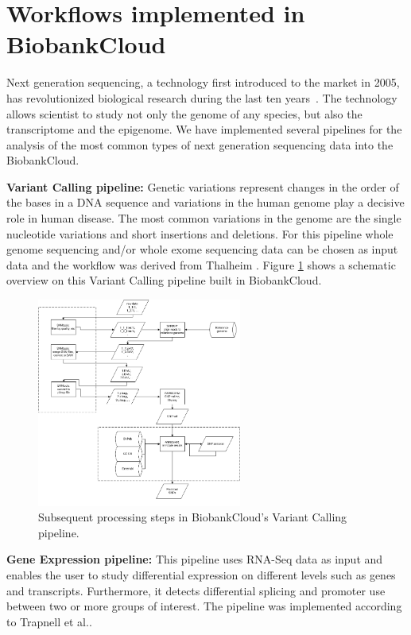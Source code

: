 \section{Workflows implemented in BiobankCloud}
Next generation sequencing, a technology first introduced to the market in 2005, has revolutionized biological research during the last ten years~\cite{shendure2008next}. The technology allows scientist to study not only the genome of any species, but also the transcriptome and the epigenome.
We have implemented several pipelines for the analysis of the most common types of next generation sequencing data into the BiobankCloud. 

\textbf{Variant Calling pipeline:} Genetic variations represent changes in the order of the bases in a DNA sequence and variations in the human genome play a decisive role in human disease. The most common variations in the genome are the single nucleotide variations and short insertions and deletions. For this pipeline whole genome sequencing and/or whole exome sequencing data can be chosen as input data and the workflow was derived from Thalheim \cite{snp_wf_thalheim}. Figure \ref{fig:workflow_snp} shows a schematic overview on this Variant Calling pipeline built in BiobankCloud.


\vskip-5pt
\begin{figure}[h]
\centering
\includegraphics[width=0.6\textwidth]{./imgs/wf_snp.png}
\caption{Subsequent processing steps in BiobankCloud's Variant Calling pipeline.}
\label{fig:workflow_snp}
\end{figure}
\vskip-5pt


\textbf{Gene Expression pipeline:} This pipeline uses RNA-Seq data as input and enables the user to study differential expression on different levels such as 
genes and transcripts. Furthermore, it detects differential splicing and promoter use between two or more groups of interest.
The pipeline was implemented according to Trapnell et al.\cite{trapnell2012differential, trapnell2013differential}.

